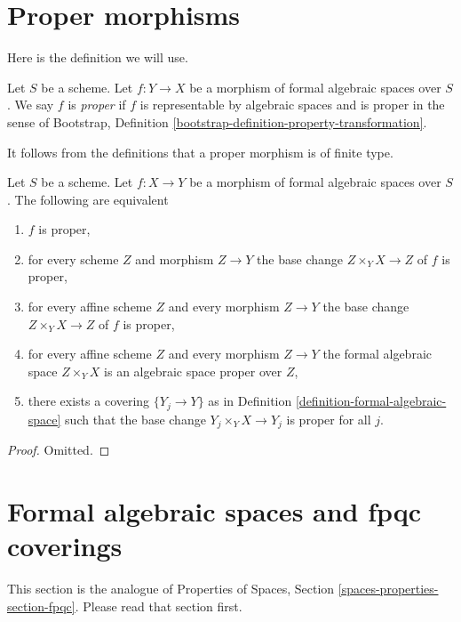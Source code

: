 \section{Proper morphisms}
\label{section-proper}

\noindent
Here is the definition we will use.

\begin{definition}
\label{definition-proper}
Let $S$ be a scheme. Let $f : Y \to X$ be a morphism of formal algebraic
spaces over $S$. We say $f$ is {\it proper}
if $f$ is representable by algebraic spaces and is proper in the sense of
Bootstrap, Definition \ref{bootstrap-definition-property-transformation}.
\end{definition}

\noindent
It follows from the definitions that a proper morphism is of finite type.

\begin{lemma}
\label{lemma-proper-local}
Let $S$ be a scheme. Let $f : X \to Y$ be a morphism of formal algebraic spaces
over $S$. The following are equivalent
\begin{enumerate}
\item $f$ is proper,
\item for every scheme $Z$ and morphism $Z \to Y$ the
base change $Z \times_Y X \to Z$ of $f$ is proper,
\item for every affine scheme $Z$ and every morphism $Z \to Y$ the
base change $Z \times_Y X \to Z$ of $f$ is proper,
\item for every affine scheme $Z$ and every morphism $Z \to Y$ the
formal algebraic space $Z \times_Y X$ is an algebraic space proper over $Z$,
\item there exists a covering $\{Y_j \to Y\}$ as in
Definition \ref{definition-formal-algebraic-space}
such that the base change $Y_j \times_Y X \to Y_j$ is proper for all $j$.
\end{enumerate}
\end{lemma}

\begin{proof}
Omitted.
\end{proof}





\section{Formal algebraic spaces and fpqc coverings}
\label{section-fpqc}

\noindent
This section is the analogue of Properties of Spaces, Section
\ref{spaces-properties-section-fpqc}. Please read that section
first.

